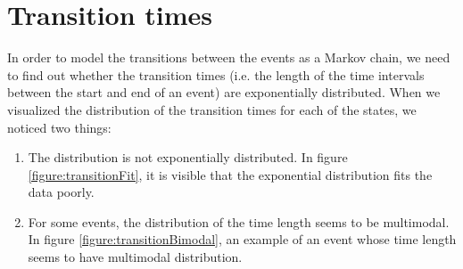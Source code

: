 \documentclass[a4paper]{thesis}
\theoremstyle{definition}
\begin{document}
\section{Transition times}
In order to model the transitions between the events as a Markov chain, we need to find out whether the transition times (i.e. the length of the time intervals between the start and end of an event) are exponentially distributed.
When we visualized the distribution of the transition times for each of the states, we noticed two things:
\begin{enumerate}
	\item The distribution is not exponentially distributed.
	In figure \ref{figure:transitionFit}, it is visible that the exponential distribution fits the data poorly.
	\item For some events, the distribution of the time length seems to be multimodal.
	In figure \ref{figure:transitionBimodal}, an example of an event whose time length seems to have multimodal distribution.
\end{enumerate}
\end{document}
